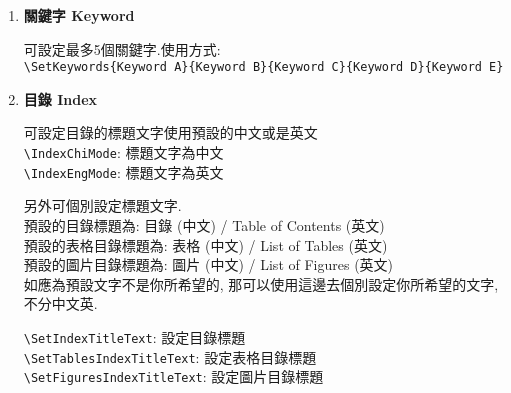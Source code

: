 \begin{enumerate}
{    口試証明文件是使用'範例'或是'自己的檔案', 只能選擇其中一方.

    如果要用的是範例:\\
    \verb|\DisplayOralTemplate|: 顯示 / 使用 口試範例版本.\\
    \verb|\SetCommitteeSize{8}|: 口試委員數量, 要配合\verb|\DisplayOralTemplate|來使用, 至少4位, 最多8位, 預設為8位.\\

    而如果要用的是自己的檔案:\\
    把你的圖片放在'context/oral'下, 之後設定中英文版所對應是哪一個檔案.\\
    例子用的'oral-chi.pdf'和'oral-eng.pdf'已放在'context/oral'中.
    \verb|\DisplayOralImage|: 設定要顯示圖片
    \verb|\SetOralImageChi{oral-chi.pdf}|: 設定中文口試檔名
    \verb|\SetOralImageEng{oral-eng.pdf}|: 設定英文口試檔名

    雖然沒有限定圖片的格式, 但是推薦使用PDF, 而且是沒法使用SVG.
  } %

  \item
  {
    \textbf{關鍵字 Keyword}

    可設定最多5個關鍵字.使用方式:\\
    \verb|\SetKeywords{Keyword A}{Keyword B}{Keyword C}{Keyword D}{Keyword E}|
  } %

  \item
  {
    \textbf{目錄 Index}

    可設定目錄的標題文字使用預設的中文或是英文\\
    \verb|\IndexChiMode|:  標題文字為中文\\
    \verb|\IndexEngMode|:  標題文字為英文

    另外可個別設定標題文字.\\
    預設的目錄標題為: 目錄 (中文) / Table of Contents (英文)\\
    預設的表格目錄標題為: 表格 (中文) / List of Tables (英文)\\
    預設的圖片目錄標題為: 圖片 (中文) / List of Figures (英文)\\
    如應為預設文字不是你所希望的, 那可以使用這邊去個別設定你所希望的文字, 不分中文英.

    \verb|\SetIndexTitleText|: 設定目錄標題\\
    \verb|\SetTablesIndexTitleText|: 設定表格目錄標題\\
    \verb|\SetFiguresIndexTitleText|: 設定圖片目錄標題
  } %


\end{enumerate}

